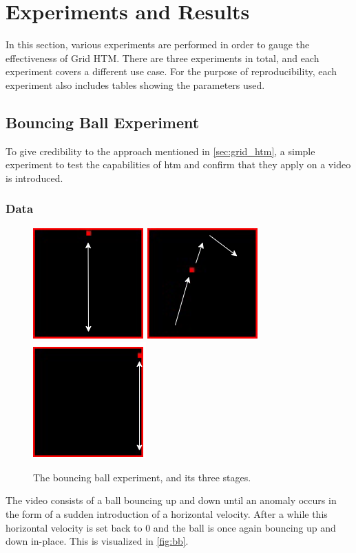 \chapter{Experiments and Results}
\label{sec:experiments}
In this section, various experiments are performed in order to gauge the effectiveness of Grid HTM. There are three experiments in total, and each experiment covers a different use case. For the purpose of reproducibility, each experiment also includes tables showing the parameters used.
\section{Bouncing Ball Experiment}
To give credibility to the approach mentioned in \autoref{sec:grid_htm}, a simple experiment to test the capabilities of \gls*{htm} and confirm that they apply on a video is introduced.
\subsection{Data}
\begin{figure}[H]
    \centering
    \includegraphics[width=.3\textwidth]{resources/experiments/bouncing_ball/bb_updown1.png}\hfill
    \includegraphics[width=.3\textwidth]{resources/experiments/bouncing_ball/bb_updownside.png}\hfill
    \includegraphics[width=.3\textwidth]{resources/experiments/bouncing_ball/bb_updown2.png}
    \caption[Bouncing Ball Experiment]{The bouncing ball experiment, and its three stages.}
    \label{fig:bb}
\end{figure}
The video consists of a ball bouncing up and down until an anomaly occurs in the form of a sudden introduction of a horizontal velocity. After a while this horizontal velocity is set back to 0 and the ball is once again bouncing up and down in-place. This is visualized in \autoref{fig:bb}.
\par
